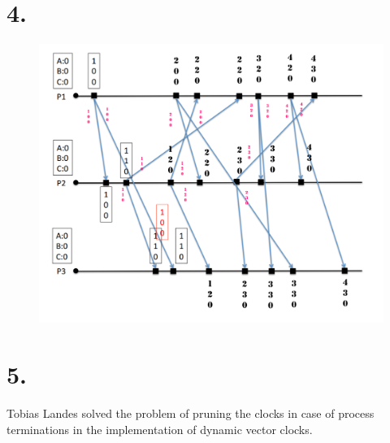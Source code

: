 \documentclass[10pt,a4paper]{article}
\begin{document}
	\section*{4.}
		\begin{figure}[H]
			\centering
			\includegraphics*[width=\textwidth]{A3_4_4.png}
		\end{figure}
	
	\section*{5.}
		Tobias Landes solved the problem of pruning the clocks in case of process terminations in the implementation of dynamic vector clocks.
	
\end{document}
